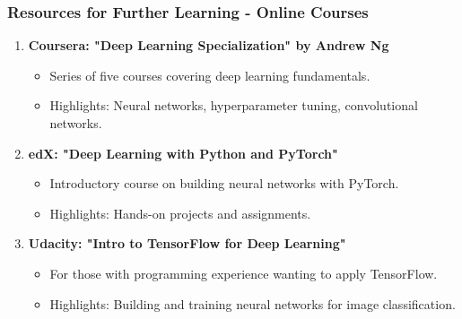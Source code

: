 \documentclass[aspectratio=169]{beamer}
\begin{document}
\begin{frame}[fragile]
    \frametitle{Resources for Further Learning - Online Courses}
    \begin{enumerate}
        \item \textbf{Coursera: "Deep Learning Specialization" by Andrew Ng}
        \begin{itemize}
            \item Series of five courses covering deep learning fundamentals.
            \item Highlights: Neural networks, hyperparameter tuning, convolutional networks.
        \end{itemize}
        
        \item \textbf{edX: "Deep Learning with Python and PyTorch"}
        \begin{itemize}
            \item Introductory course on building neural networks with PyTorch.
            \item Highlights: Hands-on projects and assignments.
        \end{itemize}
        
        \item \textbf{Udacity: "Intro to TensorFlow for Deep Learning"}
        \begin{itemize}
            \item For those with programming experience wanting to apply TensorFlow.
            \item Highlights: Building and training neural networks for image classification.
        \end{itemize}
    \end{enumerate}
\end{frame}
\end{document}
